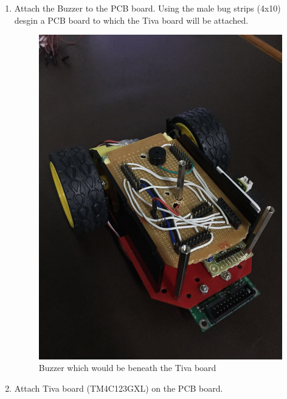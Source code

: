 \documentclass[a4paper,12pt,oneside]{book}
\begin{document}
\begin{enumerate}
	\item Attach the Buzzer to the PCB board. Using the male bug strips (4x10) desgin a PCB board to which the Tiva board will be attached.
	\begin{figure}[h]
		\centering
		\includegraphics[scale=0.16]{buzzer}
		\caption{Buzzer which would be beneath the Tiva board}
	\end{figure}
	\item Attach Tiva board (TM4C123GXL) on the PCB board.
	\begin{figure}[h]
		\centering

\end{figure}
\end{enumerate}
\end{document}
